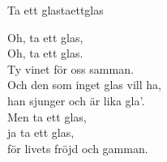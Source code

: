 \begin{song}{Ta ett glas}{taettglas}

\begin{vers}
Oh, ta ett glas,\\
Oh, ta ett glas.\\
Ty vinet för oss samman.\\
Och den som inget glas vill ha,\\
han sjunger och är lika gla'.\\
Men ta ett glas,\\
ja ta ett glas,\\
för livets fröjd och gamman.\\
\end{vers}
\end{song}

